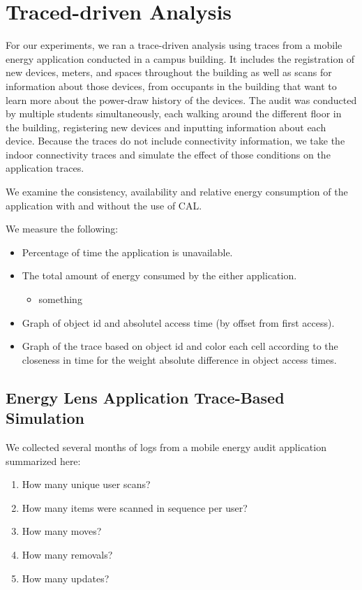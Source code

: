 

\section{Traced-driven Analysis}
For our experiments, we ran a trace-driven analysis using traces from a mobile energy application conducted
in a campus building.  It includes the registration of new devices, meters, and spaces throughout the building
as well as scans for information about those devices, from occupants in the building that want to learn more
about the power-draw history of the devices.  The audit was conducted by multiple students simultaneously, each
walking around the different floor in the building, registering new devices and inputting information about
each device.  Because the traces do not include connectivity information, we 
take the indoor connectivity traces and simulate the effect of those conditions on the application traces.

We examine the consistency, availability and relative energy consumption of the application with and without
the use of CAL.

We measure the following:

\begin{itemize}
\item Percentage of time the application is unavailable.
\item The total amount of energy consumed by the either application. 
	\begin{itemize}
	\item something
	\end{itemize}
\item Graph of object id and absolutel access time (by offset from first access).
\item Graph of the trace based on object id and color each cell according to the closeness in time for the weight
		absolute difference in object access times.
\end{itemize}

\subsection{Energy Lens Application Trace-Based Simulation}

We collected several months of logs from a mobile energy audit application summarized here:

\begin{enumerate}
\item How many unique user scans?
\item How many items were scanned in sequence per user?
\item How many moves?
\item How many removals?
\item How many updates?
\end{enumerate}


